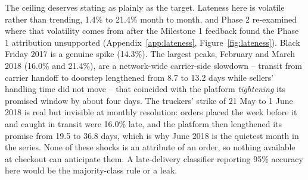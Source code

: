 The ceiling deserves stating as plainly as the target. Lateness here is volatile
rather than trending, 1.4\% to 21.4\% month to month, and Phase 2 re-examined
where that volatility comes from after the Milestone 1 feedback found the
Phase 1 attribution unsupported (Appendix~\ref{app:lateness},
Figure~\ref{fig:lateness}). Black Friday 2017 is a genuine spike (14.3\%). The
largest peaks, February and March 2018 (16.0\% and 21.4\%), are a network-wide
carrier-side slowdown -- transit from carrier handoff to doorstep lengthened
from 8.7 to 13.2 days while sellers' handling time did not move -- that
coincided with the platform \emph{tightening} its promised window by about four
days. The truckers' strike of 21 May to 1 June 2018 \citep{bloomberg2018strike,
tecnoblog2018correios} is real but invisible at monthly resolution: orders
placed the week before it and caught in transit were 16.0\% late, and the
platform then lengthened its promise from 19.5 to 36.8 days, which is why June
2018 is the quietest month in the series. None of these shocks is an attribute
of an order, so nothing available at checkout can anticipate them. A
late-delivery classifier reporting 95\% accuracy here would be the
majority-class rule or a leak.
